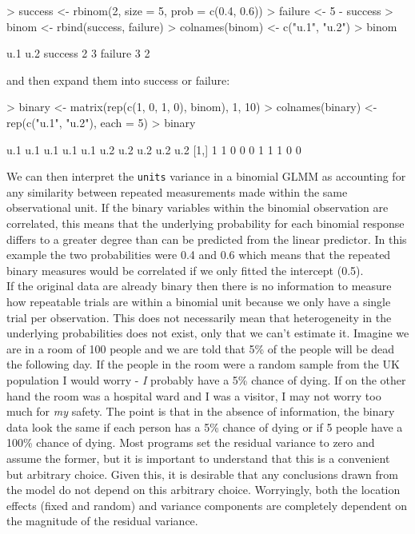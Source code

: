 \documentclass{article}
\begin{document}
\begin{Schunk}
\begin{Sinput}
> success <- rbinom(2, size = 5, prob = c(0.4, 0.6))
> failure <- 5 - success
> binom <- rbind(success, failure)
> colnames(binom) <- c("u.1", "u.2")
> binom
\end{Sinput}
\begin{Soutput}
        u.1 u.2
success   2   3
failure   3   2
\end{Soutput}
\end{Schunk}

and then expand them into success or failure:

\begin{Schunk}
\begin{Sinput}
> binary <- matrix(rep(c(1, 0, 1, 0), binom), 1, 10)
> colnames(binary) <- rep(c("u.1", "u.2"), each = 5)
> binary
\end{Sinput}
\begin{Soutput}
     u.1 u.1 u.1 u.1 u.1 u.2 u.2 u.2 u.2 u.2
[1,]   1   1   0   0   0   1   1   1   0   0
\end{Soutput}
\end{Schunk}

We can then interpret the \texttt{units} variance in a binomial GLMM as accounting for any similarity between repeated measurements made within the same observational unit. If the binary variables within the binomial observation are correlated, this means that the underlying probability for each binomial response differs to a greater degree than can be predicted from the linear predictor. In this example the two probabilities were 0.4 and 0.6 which means that the repeated binary measures would be correlated if we only fitted the intercept (0.5).\\  

If the original data are already binary then there is no information to measure how repeatable trials are within a binomial unit because we only have a single trial per observation. This does not necessarily mean that heterogeneity in the underlying probabilities does not exist, only that we can't estimate it. Imagine we are in a room of 100 people and we are told that 5\% of the people will be dead the following day.  If the people in the room were a random sample from the UK population I would worry - \emph{I} probably have a 5\% chance of dying. If on the other hand the room was a hospital ward and I was a visitor, I may not worry too much for \emph{my} safety. The point is that in the absence of information, the binary data look the same if each person has a 5\% chance of dying or if 5 people have a 100\% chance of dying.  Most programs set the residual variance to zero and assume the former, but it is important to understand that this is a convenient but arbitrary choice. Given this, it is desirable that any conclusions drawn from the model do not depend on this arbitrary choice. Worryingly, both the location effects (fixed and random) and variance components are completely dependent on the magnitude of the residual variance.\\
\end{document}
